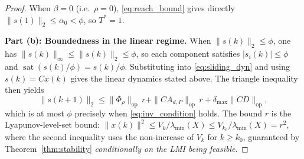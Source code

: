 \documentclass[10pt]{amsart}
\DeclareMathOperator{\sat}{sat}
\numberwithin{equation}{section}
\begin{document}
\begin{proof}
When $\beta = 0$ (i.e.\ $\rho = 0$), \eqref{eq:reach_bound} gives directly
$\|s(1)\|_2 \leq \alpha_0 < \phi$, so $T^*=1$.

\textbf{Part (b): Boundedness in the linear regime.}
When $\|s(k)\|_2 \leq \phi$, one has $\|s(k)\|_\infty \leq \|s(k)\|_2 \leq \phi$,
so each component satisfies $|s_i(k)| \leq \phi$ and $\sat(s(k)/\phi) = s(k)/\phi$.
Substituting into \eqref{eq:sliding_dyn} and using $s(k) = Cx(k)$ gives the linear
dynamics stated above. The triangle inequality then yields
\[
\|s(k+1)\|_2 \leq \|\Phi_\rho\|_{\mathrm{op}}\,r
+ \|CA_{d,P}\|_{\mathrm{op}}\,r + \delta_{\max}\|CD\|_{\mathrm{op}},
\]
which is at most $\phi$ precisely when \eqref{eq:inv_condition} holds. The bound $r$
is the Lyapunov-level-set bound:
$\|x(k)\|^2 \leq V_k/\lambda_{\min}(X) \leq V_{k_0}/\lambda_{\min}(X) = r^2$, where
the second inequality uses the non-increase of $V_k$ for $k \geq k_0$, guaranteed by
Theorem~\ref{thm:stability} \emph{conditionally on the LMI being feasible}.
\end{proof}
\end{document}
